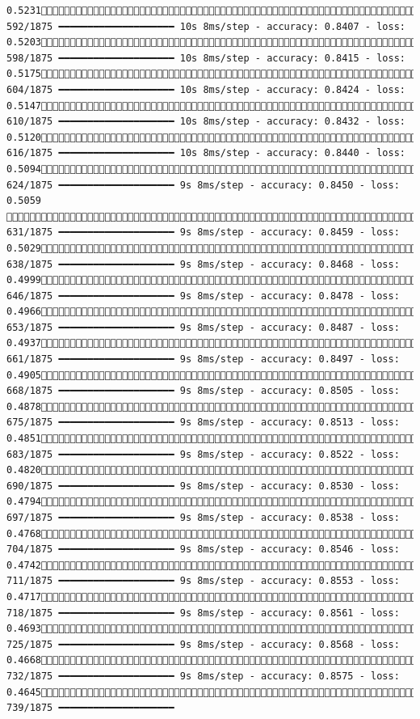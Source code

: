 \documentclass[
  letterpaper,
  DIV=11,
  numbers=noendperiod]{scrreprt}
\begin{document}
\begin{verbatim}
0.5231 592/1875 ━━━━━━━━━━━━━━━━━━━━ 10s 8ms/step - accuracy: 0.8407 - loss: 0.5203 598/1875 ━━━━━━━━━━━━━━━━━━━━ 10s 8ms/step - accuracy: 0.8415 - loss: 0.5175 604/1875 ━━━━━━━━━━━━━━━━━━━━ 10s 8ms/step - accuracy: 0.8424 - loss: 0.5147 610/1875 ━━━━━━━━━━━━━━━━━━━━ 10s 8ms/step - accuracy: 0.8432 - loss: 0.5120 616/1875 ━━━━━━━━━━━━━━━━━━━━ 10s 8ms/step - accuracy: 0.8440 - loss: 0.5094 624/1875 ━━━━━━━━━━━━━━━━━━━━ 9s 8ms/step - accuracy: 0.8450 - loss: 0.5059  631/1875 ━━━━━━━━━━━━━━━━━━━━ 9s 8ms/step - accuracy: 0.8459 - loss: 0.5029 638/1875 ━━━━━━━━━━━━━━━━━━━━ 9s 8ms/step - accuracy: 0.8468 - loss: 0.4999 646/1875 ━━━━━━━━━━━━━━━━━━━━ 9s 8ms/step - accuracy: 0.8478 - loss: 0.4966 653/1875 ━━━━━━━━━━━━━━━━━━━━ 9s 8ms/step - accuracy: 0.8487 - loss: 0.4937 661/1875 ━━━━━━━━━━━━━━━━━━━━ 9s 8ms/step - accuracy: 0.8497 - loss: 0.4905 668/1875 ━━━━━━━━━━━━━━━━━━━━ 9s 8ms/step - accuracy: 0.8505 - loss: 0.4878 675/1875 ━━━━━━━━━━━━━━━━━━━━ 9s 8ms/step - accuracy: 0.8513 - loss: 0.4851 683/1875 ━━━━━━━━━━━━━━━━━━━━ 9s 8ms/step - accuracy: 0.8522 - loss: 0.4820 690/1875 ━━━━━━━━━━━━━━━━━━━━ 9s 8ms/step - accuracy: 0.8530 - loss: 0.4794 697/1875 ━━━━━━━━━━━━━━━━━━━━ 9s 8ms/step - accuracy: 0.8538 - loss: 0.4768 704/1875 ━━━━━━━━━━━━━━━━━━━━ 9s 8ms/step - accuracy: 0.8546 - loss: 0.4742 711/1875 ━━━━━━━━━━━━━━━━━━━━ 9s 8ms/step - accuracy: 0.8553 - loss: 0.4717 718/1875 ━━━━━━━━━━━━━━━━━━━━ 9s 8ms/step - accuracy: 0.8561 - loss: 0.4693 725/1875 ━━━━━━━━━━━━━━━━━━━━ 9s 8ms/step - accuracy: 0.8568 - loss: 0.4668 732/1875 ━━━━━━━━━━━━━━━━━━━━ 9s 8ms/step - accuracy: 0.8575 - loss: 0.4645 739/1875 ━━━━━━━━━━━━━━━━━━━━ 
\end{verbatim}
\end{document}
